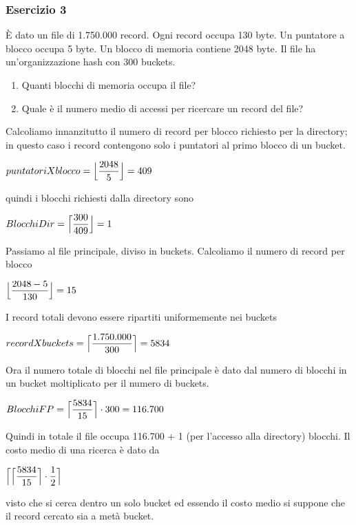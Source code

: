 \subsubsection{Esercizio 3}
\`E dato un file di 1.750.000 record. Ogni record occupa 130 byte. Un puntatore a blocco occupa 5 byte. 
Un blocco di memoria contiene 2048 byte. Il file ha un’organizzazione hash con 300 buckets.
\begin{enumerate}
 \item Quanti blocchi di memoria occupa il file?
 \item Quale è il numero medio di accessi per ricercare un record del file?
\end{enumerate}
\begin{multicols}{2}
Calcoliamo innanzitutto il numero di record per blocco richiesto per la directory; in questo
caso i record contengono solo i puntatori al primo blocco di un bucket.
\begin{center}
 $puntatori X blocco = \Bigl\lfloor \dfrac{2048}{5} \Bigr\rfloor = 409$
\end{center}
quindi i blocchi richiesti dalla directory sono
\begin{center}
 $BlocchiDir = \Bigl\lceil \dfrac{300}{409} \Bigr\rfloor = 1$
\end{center}
Passiamo al file principale, diviso in buckets. Calcoliamo il numero di record per blocco
\begin{center}
 $\Bigl\lfloor \dfrac{2048-5}{130} \Bigr\rfloor = 15$
\end{center}
I record totali devono essere ripartiti uniformemente nei buckets
\begin{center}
 $record X buckets = \Bigl\lceil \dfrac{1.750.000}{300} \Bigr\rceil = 5834$
\end{center}
Ora il numero totale di blocchi nel file principale è dato dal numero di blocchi in un bucket
moltiplicato per il numero di buckets.
\begin{center}
 $BlocchiFP = \Bigl\lceil \dfrac{5834}{15} \Bigr\rceil \cdot 300 = 116.700$
\end{center}
Quindi in totale il file occupa 116.700 + 1 (per l'accesso alla directory) blocchi. Il costo medio di 
una ricerca è dato da
\begin{center}
 $\Bigl\lceil \Bigl\lceil \dfrac{5834}{15} \Bigr\rceil \cdot \dfrac{1}{2} \Bigr\rceil$
\end{center}
visto che si cerca dentro un solo bucket ed essendo il costo medio si suppone che il record
cercato sia a metà bucket.
\end{multicols}








